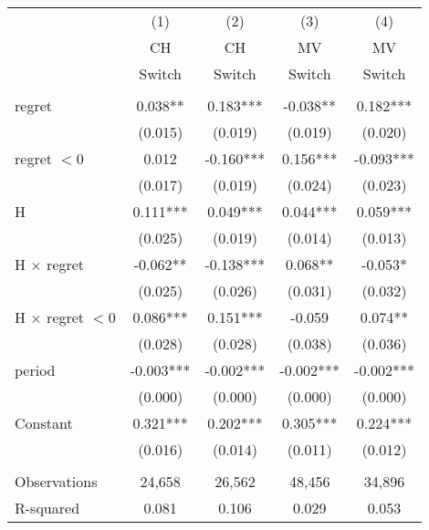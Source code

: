 \documentclass[]{article}
\begin{document}
\begin{tabular}{lcccc} \hline

  & (1) & (2) & (3) & (4) \\
    & CH & CH & MV & MV \\
& Switch & Switch &Switch & Switch\\ \hline
 &  &  &  &  \\
regret & 0.038** & 0.183*** & -0.038** & 0.182*** \\
 & (0.015) & (0.019) & (0.019) & (0.020) \\
regret $< 0$ & 0.012 & -0.160*** & 0.156*** & -0.093*** \\
 & (0.017) & (0.019) & (0.024) & (0.023) \\
H & 0.111*** & 0.049*** & 0.044*** & 0.059*** \\
 & (0.025) & (0.019) & (0.014) & (0.013) \\
H $\times$ regret  & -0.062** & -0.138*** & 0.068** & -0.053* \\
 & (0.025) & (0.026) & (0.031) & (0.032) \\
H $\times$ regret  $< 0$ & 0.086*** & 0.151*** & -0.059 & 0.074** \\
 & (0.028) & (0.028) & (0.038) & (0.036) \\
period & -0.003*** & -0.002*** & -0.002*** & -0.002*** \\
 & (0.000) & (0.000) & (0.000) & (0.000) \\
Constant & 0.321*** & 0.202*** & 0.305*** & 0.224*** \\
 & (0.016) & (0.014) & (0.011) & (0.012) \\
 &  &  &  &  \\
Observations & 24,658 & 26,562 & 48,456 & 34,896 \\
 R-squared & 0.081 & 0.106 & 0.029 & 0.053 \\ \hline
\end{tabular}
\end{document}
